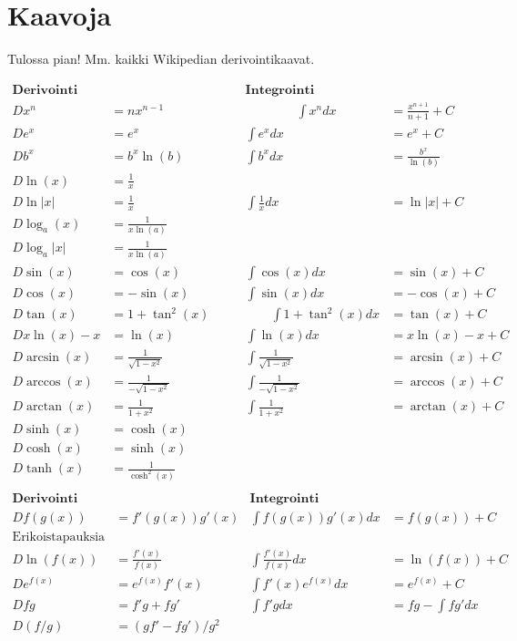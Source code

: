 \documentclass[12pt]{article}
\begin{document}
\section*{Kaavoja}

Tulossa pian! Mm. kaikki Wikipedian derivointikaavat.

$$
\begin{array}{rl|rl}
\textbf{Derivointi} && \textbf{Integrointi}&\\[2mm]
Dx^n&=nx^{n-1}     \qquad\qquad&\qquad\qquad\int x^ndx&=\frac{x^{n+1}}{n+1}+C \\[2mm]
De^x&=e^x &\int e^xdx&=e^x+C\\[2mm]
Db^x&=b^x\ln(b) & \int b^xdx&=\frac{b^x}{\ln(b)}\\[2mm]
D\ln(x)&=\frac{1}{x} &&\\[2mm]
D\ln|x|&=\frac{1}{x} &\int\frac{1}{x}dx&=\ln|x|+C\\[2mm]
D\log_a(x)&=\frac{1}{x\ln(a)} &&\\[2mm]
D\log_a|x|&=\frac{1}{x\ln(a)} &&\\[2mm]
D\sin(x)&=\cos(x)   &\int\cos(x)dx&=\sin(x)+C\\[2mm]
D\cos(x)&=-\sin(x)  &\int\sin(x)dx&=-\cos(x)+C\\[2mm]
D\tan(x)&=1+\tan^2(x) \qquad&\qquad\int 1+\tan^2(x)dx&=\tan(x)+C\\[2mm]

Dx\ln(x)-x&=\ln(x) & \int\ln(x)dx&=x\ln(x)-x+C\\[10mm]

D\arcsin(x)&=\frac{1}{\sqrt{1-x^2}} & \int\frac{1}{\sqrt{1-x^2}}&=\arcsin(x)+C\\
D\arccos(x)&=\frac{1}{-\sqrt{1-x^2}} & \int\frac{1}{-\sqrt{1-x^2}}&=\arccos(x)+C\\
D\arctan(x)&=\frac{1}{1+x^2} & \int\frac{1}{1+x^2}&=\arctan(x)+C\\

D\sinh(x)&=\cosh(x) &&\\
D\cosh(x)&=\sinh(x) &&\\
D\tanh(x)&=\frac{1}{\cosh^2(x)} &&\\
\end{array}  
$$
\vspace{1cm}
$$
\begin{array}{rl|rl}
\textbf{Derivointi} && \textbf{Integrointi}&\\[2mm]
D f(g(x))&=f'(g(x))g'(x) & \int f(g(x))g'(x)dx&=f(g(x))+C\\[2mm]
\textrm{Erikoistapauksia} &&&\\
D\ln(f(x))&=\frac{f'(x)}{f(x)} & \int \frac{f'(x)}{f(x)}dx&=\ln(f(x))+C\\[2mm]
D e^{f(x)}&=e^{f(x)}f'(x) & \int f'(x)e^{f(x)}dx&=e^{f(x)}+C\\[10mm]
D fg&=f'g+fg'& \int f'g dx&=fg-\int fg'dx\\[2mm]
D (f/g)&=(gf'-fg')/g^2 &&\\[2mm]
\end{array}  
$$
\end{document}
